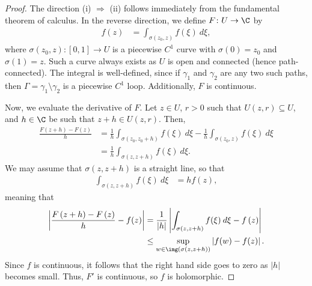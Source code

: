 \documentclass[10pt]{mypackage}
\begin{document}
\begin{proof}
  The direction (i) $\Rightarrow$ (ii) follows immediately from the fundamental theorem of calculus. In the reverse direction, we define $F\colon U\rightarrow \C$ by
  \begin{align*}
    f(z) &= \int_{\sigma\left( z_0,z \right)}^{} f\left( \xi \right)\:d\xi,
  \end{align*}
  where $\sigma\left( z_0,z \right)\colon [0,1]\rightarrow U$ is a piecewise $C^{1}$ curve with $\sigma(0) = z_0$ and $\sigma(1) = z$. Such a curve always exists as $U$ is open and connected (hence path-connected). The integral is well-defined, since if $\gamma_1$ and $\gamma_2$ are any two such paths, then $\Gamma = \gamma_1\setminus \gamma_2$ is a piecewise $C^1$ loop. Additionally, $F$ is continuous.\newline

  Now, we evaluate the derivative of $F$. Let $z\in U$, $r > 0$ such that $U\left( z,r \right)\subseteq U$, and $h\in \C$ be such that $z + h\in U\left( z,r \right)$. Then,
  \begin{align*}
    \frac{F\left( z+h \right) - F\left( z \right)}{h} &= \frac{1}{h} \int_{\sigma\left( z_0,z_0 + h \right)}^{} f\left( \xi \right)\:d\xi - \frac{1}{h} \int_{\sigma\left( z_0,z \right)}^{} f\left( \xi \right)\:d\xi\\
                                                      &= \frac{1}{h} \int_{\sigma\left( z,z+h \right)}^{} f\left( \xi \right)\:d\xi.
  \end{align*}
  We may assume that $\sigma\left( z,z+h \right)$ is a straight line, so that
  \begin{align*}
    \int_{\sigma\left( z,z+h \right)}^{} f\left( \xi \right)\:d\xi &= hf(z),
  \end{align*}
  meaning that
  \begin{align*}
    \left\vert \frac{F\left( z+h \right)-F\left( z \right)}{h} - f(z) \right\vert &= \frac{1}{\left\vert h \right\vert} \left\vert \int_{\sigma\left( z,z+h \right)}^{} f(\xi)\:d\xi - f\left( z \right) \right\vert\\
                                                                                  &\leq \sup_{w\in \img\left( \sigma\left( z,z+h \right) \right)} \left\vert f(w)-f(z) \right\vert.
  \end{align*}
  Since $f$ is continuous, it follows that the right hand side goes to zero as $\left\vert h \right\vert$ becomes small. Thus, $F'$ is continuous, so $f$ is holomorphic.
\end{proof}
\end{document}
